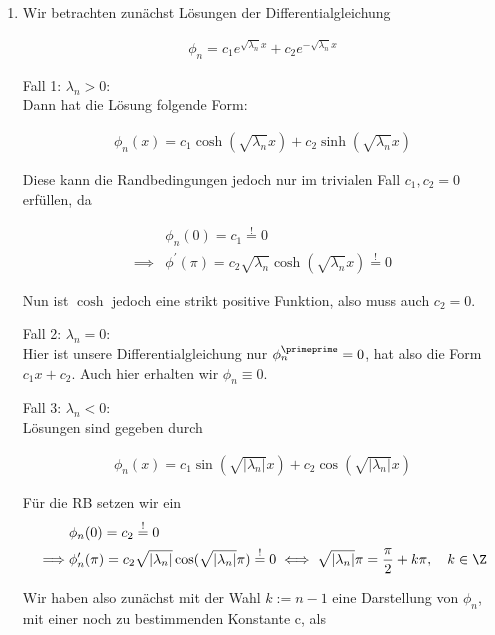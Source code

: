 \begin{solution}
\begin{enumerate}[label = (\roman*)]
  \item Wir betrachten zunächst Lösungen der Differentialgleichung

  \begin{align*}
    \phi_n
    =
    c_1 e^{\sqrt{\lambda_n}x} + c_2 e^{-\sqrt{\lambda_n}x}
  \end{align*}

  Fall 1: $\lambda_n > 0$: \\
  Dann hat die Lösung folgende Form:

  \begin{align*}
    \phi_n(x)
    =
    c_1 \cosh(\sqrt{\lambda_n}x) + c_2 \sinh(\sqrt{\lambda_n}x)
  \end{align*}

  Diese kann die Randbedingungen jedoch nur im trivialen Fall $c_1, c_2 = 0$ erfüllen, da

  \begin{align*}
    &\phi_n(0) = c_1 \stackrel{!}{=} 0\\
    \implies
    &\phi^\prime(\pi) = c_2 \sqrt{\lambda_n} \cosh({\sqrt{\lambda_n}x}) \stackrel{!}{=} 0
  \end{align*}

  Nun ist $\cosh$ jedoch eine strikt positive Funktion, also muss auch $c_2 = 0$.

  Fall 2: $\lambda_n = 0$: \\
  Hier ist unsere Differentialgleichung nur $\phi_n^\primeprime = 0$, hat also die Form $c_1 x + c_2$. Auch hier erhalten wir $\phi_n \equiv 0$.

  Fall 3: $\lambda_n < 0$: \\
  Lösungen sind gegeben durch

  \begin{align*}
    \phi_n(x) = c_1 \sin(\sqrt{|\lambda_n|}x) + c_2 \cos(\sqrt{|\lambda_n|}x)
  \end{align*}

  Für die RB setzen wir ein
  \begin{align*}
    &\phi_n(0) = c_2 \stackrel{!}{=}0 \\
    \implies
    &\phi_n^\prime(\pi) = c_2 \sqrt{|\lambda_n|} \cos({\sqrt{|\lambda_n|}\pi}) \stackrel{!}{=} 0
    \iff
    \sqrt{|\lambda_n|}\pi = \frac{\pi}{2} + k\pi, \quad k \in \Z
  \end{align*}

  Wir haben also zunächst mit der Wahl $k := n-1$ eine Darstellung von $\phi_n$, mit einer noch zu bestimmenden Konstante c, als


\end{enumerate}
\end{solution}
